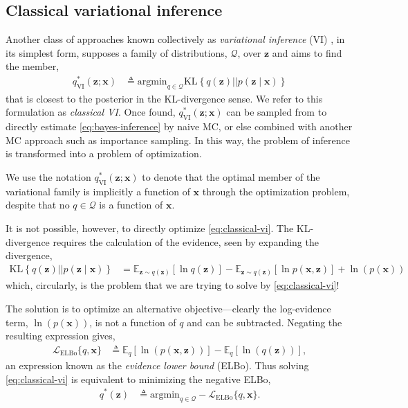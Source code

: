 \subsection{Classical variational inference}
Another class of approaches known collectively as \emph{variational inference} (VI) \citep{jordan1999introduction, BleiEtAl2016, zhang2018advances}, in its simplest form, supposes a family of distributions, $\mathcal{Q}$, over $\mathbf{z}$ and aims to find the member,
\begin{align}\label{eq:classical-vi}
	q^*_{\text{VI}}(\mathbf{z};\mathbf{x}) &\triangleq\text{argmin}_{q\in\mathcal{Q}}\text{KL}\left\{q(\mathbf{z})||p(\mathbf{z}\mid\mathbf{x})\right\}
\end{align}
that is closest to the posterior in the KL-divergence sense. We refer to this formulation as \emph{classical VI}. Once found, $q_{\text{VI}}^*(\mathbf{z};\mathbf{x})$ can be sampled from to directly estimate \eqref{eq:bayes-inference} by naive MC, or else combined with another MC approach such as importance sampling. In this way, the problem of inference is transformed into a problem of optimization.

We use the notation $q^*_{\text{VI}}(\mathbf{z};\mathbf{x})$ to denote that the optimal member of the variational family is implicitly a function of $\mathbf{x}$ through the optimization problem, despite that no $q\in\mathcal{Q}$ is a function of $\mathbf{x}$.

It is not possible, however, to directly optimize \eqref{eq:classical-vi}. The KL-divergence requires the calculation of the evidence, seen by expanding the divergence,
\begin{align*}
	\text{KL}\left\{q(\mathbf{z})||p(\mathbf{z}\mid\mathbf{x})\right\} &= \mathbb{E}_{\mathbf{z}\sim q(\mathbf{z})}\left[\ln q(\mathbf{z})\right] - \mathbb{E}_{\mathbf{z}\sim q(\mathbf{z})}\left[\ln p(\mathbf{x},\mathbf{z})\right] + \ln(p(\mathbf{x}))
\end{align*}
which, circularly, is the problem that we are trying to solve by \eqref{eq:classical-vi}!

The solution is to optimize an alternative objective---clearly the log-evidence term, $\ln(p(\mathbf{x}))$, is not a function of $q$ and can be subtracted. Negating the resulting expression gives,
\begin{align*}
	\mathcal{L}_{\text{ELBo}}\{q,\mathbf{x}\} &\triangleq \mathbb{E}_{q}\left[\ln(p(\mathbf{x},\mathbf{z}))\right] - \mathbb{E}_q\left[\ln(q(\mathbf{z}))\right],
\end{align*}
an expression known as the \emph{evidence lower bound} (ELBo). Thus solving \eqref{eq:classical-vi} is equivalent to minimizing the negative ELBo,
\begin{align}\label{eq:neg-elbo}
	q^*(\mathbf{z}) &\triangleq\text{argmin}_{q\in\mathcal{Q}}-\mathcal{L}_{\text{ELBo}}\{q,\mathbf{x}\}.
\end{align}

